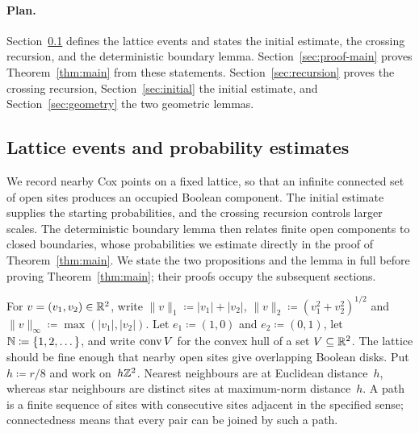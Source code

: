 \documentclass[11pt,letterpaper]{article}
\begin{document}
\paragraph{Plan.} Section~\ref{sec:lattice-events} defines the lattice events and states the initial estimate, the crossing recursion, and the deterministic boundary lemma. Section~\ref{sec:proof-main} proves Theorem~\ref{thm:main} from these statements. Section~\ref{sec:recursion} proves the crossing recursion, Section~\ref{sec:initial} the initial estimate, and Section~\ref{sec:geometry} the two geometric lemmas.

\subsection{Lattice events and probability estimates}
\label{sec:lattice-events}

We record nearby Cox points on a fixed lattice, so that an infinite connected set of open sites produces an occupied Boolean component. The initial estimate supplies the starting probabilities, and the crossing recursion controls larger scales. The deterministic boundary lemma then relates finite open components to closed boundaries, whose probabilities we estimate directly in the proof of Theorem~\ref{thm:main}. We state the two propositions and the lemma in full before proving Theorem~\ref{thm:main}; their proofs occupy the subsequent sections.

For $v=(v_1,v_2)\in\mathbb R^2$, write $\lVert v\rVert_1\coloneqq\lvert v_1\rvert+\lvert v_2\rvert$, $\lVert v\rVert_2\coloneqq(v_1^2+v_2^2)^{1/2}$ and $\lVert v\rVert_\infty\coloneqq\max(\lvert v_1\rvert,\lvert v_2\rvert)$. Let $e_1\coloneqq(1,0)$ and $e_2\coloneqq(0,1)$, let $\mathbb N\coloneqq\{1,2,\dots\}$, and write $\operatorname{conv} V$ for the convex hull of a set $V\subseteq\mathbb R^2$. The lattice should be fine enough that nearby open sites give overlapping Boolean disks. Put $h\coloneqq r/8$ and work on~$h\mathbb Z^2$. Nearest neighbours are at Euclidean distance~$h$, whereas star neighbours are distinct sites at maximum-norm distance~$h$. A path is a finite sequence of sites with consecutive sites adjacent in the specified sense; connectedness means that every pair can be joined by such a path.
\end{document}
